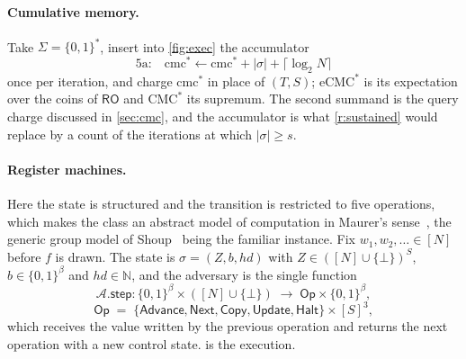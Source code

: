 \documentclass[11pt]{article}
\theoremstyle{plain}
\theoremstyle{definition}
\newcommand{\NN}{[N]}
\newcommand{\advers}{\mathcal{A}}
\newcommand{\cmcs}{\mathrm{cmc}^{*}}
\newcommand{\eCMCs}{\mathrm{eCMC}^{*}}
\newcommand{\CMCs}{\mathrm{CMC}^{*}}
\newcommand{\Advance}{\mathsf{Advance}}
\newcommand{\Next}{\mathsf{Next}}
\newcommand{\Copy}{\mathsf{Copy}}
\newcommand{\Update}{\mathsf{Update}}
\newcommand{\Halt}{\mathsf{Halt}}
\newcommand{\stp}{\mathsf{step}}
\newcommand{\RO}{\mathsf{RO}}
\begin{document}
\paragraph{Cumulative memory.}
Take $\Sigma = \{0,1\}^{*}$, insert into \cref{fig:exec} the accumulator
\[
  \textrm{5a:}\quad \cmcs \gets \cmcs + |\sigma| + \lceil\log_{2}N\rceil
\]
once per iteration, and charge $\cmcs$ in place of $(T,S)$; $\eCMCs$ is its
expectation over the coins of $\RO$ and $\CMCs$ its supremum.  The second
summand is the query charge discussed in \cref{sec:cmc}, and the accumulator
is what \cref{r:sustained} would replace by a count of the iterations at
which $|\sigma| \geq s$.

\paragraph{Register machines.}
Here the state is structured and the transition is restricted to five
operations, which makes the class an abstract model of computation in
Maurer's sense~\cite{Mau05}, the generic group model of Shoup~\cite{Sho97}
being the familiar instance.  Fix $w_{1},w_{2},\dots \in \NN$ before $f$ is
drawn.  The state is $\sigma = (Z,b,hd)$ with
$Z \in (\NN\cup\{\bot\})^{S}$, $b \in \{0,1\}^{\beta}$ and
$hd \in \mathbb{N}$, and the adversary is the single function
\[
  \advers.\stp \colon \{0,1\}^{\beta} \times (\NN \cup \{\bot\})
  \;\longrightarrow\; \mathsf{Op} \times \{0,1\}^{\beta},
\]
\[
  \mathsf{Op} \;=\;
  \{\Advance,\Next,\Copy,\Update,\Halt\} \times [S]^{3},
\]
which receives the value written by the previous operation and returns the
next operation with a new control state.   is the execution.
\end{document}
